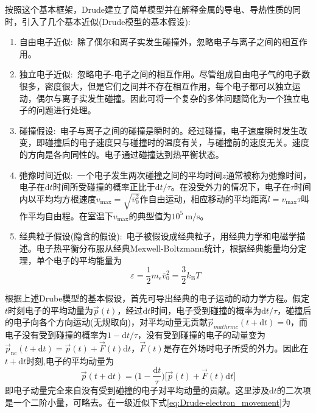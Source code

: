 按照这个基本框架，Drude建立了简单模型并在解释金属的导电、导热性质的同时，引入了几个基本近似(Drude模型的基本假设):
\begin{enumerate}
	\item 自由电子近似:~除了偶尔和离子实发生碰撞外，忽略电子与离子之间的相互作用。 
	\item 独立电子近似:~忽略电子-电子之间的相互作用。尽管组成自由电子气的电子数很多，密度很大，但是它们之间并不存在相互作用，每个电子都可以独立运动，偶尔与离子实发生碰撞。因此可将一个复杂的多体问题简化为一个独立电子的问题进行处理。

	\item 碰撞假设:~电子与离子之间的碰撞是瞬时的。经过碰撞，电子速度瞬时发生改变，即碰撞后的电子速度只与碰撞时的温度有关，与碰撞前的速度无关。速度的方向是各向同性的。电子通过碰撞达到热平衡状态。

	\item 弛豫时间近似:~一个电子发生两次碰撞之间的平均时间$z$通常被称为弛豫时间，电子在$\mathrm{d}t$时间所受碰撞的概率正比于$\mathrm{d}t/\tau$。在没受外力的情况下，电子在$\tau$时间内以平均均方根速度$v_{\max}=\sqrt{\bar{v}_0^2}$作自由运动，相应移动的平均距离$l=v_{\max}\tau$叫作平均自由程。在室温下$v_{\max}$的典型值为$10^5~\mathrm{m/s}$。

	\item 经典粒子假设(隐含的假设):~电子被假设成经典粒子，用经典力学和电磁学描述。电子热平衡分布服从经典Mexwell-Boltzmann统计，根据经典能量均分定理，单个电子的平均能量为
		\begin{displaymath}
			\varepsilon=\dfrac12m_e\bar{v}_0^2=\dfrac32k_{\mathrm{B}}T
		\end{displaymath}
\end{enumerate}
根据上述Drube模型的基本假设，首先可导出经典的电子运动的动力学方程。假定$t$时刻电子的平均动量为$\vec p(t)$，经过$\mathrm{d}t$时间，电子受到碰撞的概率为$\mathrm{d}t/\tau$，碰撞后的电子向各个方向运动(无规取向)，对平均动量无贡献$\vec p_{mathrm c}(t+\mathrm{d}t)=0$，而电子没有受到碰撞的概率为$1-\mathrm{d}t/\tau$，没有受到碰撞的电子的动量变为$\vec p_{\mathrm{nc}}(t+\mathrm{d}t)=\vec p(t)+\vec F(t)\mathrm{d}t$，$\vec F(t)$是存在外场时电子所受的外力。因此在$t+\mathrm{d}t$时刻,电子的平均动量为
\begin{equation}
	\vec p(t+\mathrm{d}t)=\bigg(1-\dfrac{\mathrm{d}t}{\tau}\bigg)\bigg[\vec p(t)+\vec F(t)\mathrm{d}t\bigg]
	\label{eq:Drude-electron_movement}
\end{equation} 
即电子动量完全来自没有受到碰撞的电子对平均动量的贡献。这里涉及$\mathrm{d}t$的二次项是一个二阶小量，可略去。在一级近似下式\eqref{eq:Drude-electron_movement}为
